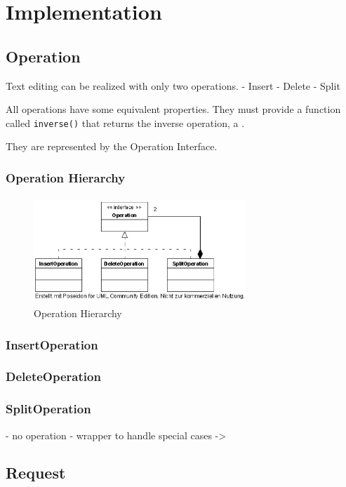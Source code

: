 
\section{Implementation}


\subsection{Operation}
Text editing can be realized with only two operations. 
 - Insert
 - Delete
 - Split

All operations have some equivalent properties. They must provide a function called \texttt{inverse()} that returns the inverse operation, a . 

They are represented by the Operation Interface.
 
\subsubsection{Operation Hierarchy}
\begin{figure}[H]
\centering
\includegraphics[height=4cm,width=8cm]{../../images/algo-impl/operation.eps}
\caption{Operation Hierarchy}
\end{figure}

\subsubsection{InsertOperation}


\subsubsection{DeleteOperation}
\subsubsection{SplitOperation}
  - no operation
  - wrapper to handle special cases -> \cite{Delete_Insert}


\subsection{Request}

